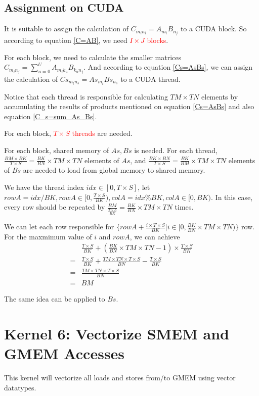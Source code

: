 \documentclass{article}
\begin{document}
\subsection{Assignment on CUDA}
It is suitable to assign the calculation of
$
    C_{m_in_i}=A_{m_i}B_{n_j}
$
to a CUDA block.
So according to equation \eqref{C=AB},
we need \textcolor{red}{$I \times J$ blocks}.

For each block, we need to calculate the smaller matrices
$
    C_{m_in_j}=\sum_{u=0}^{U} A_{m_ik_u}B_{k_un_j}
$.
And according to equation \eqref{Cs=AsBs},
we can assign the calculation of
$
    Cs_{m_tn_s}=As_{m_t}Bs_{n_s}
$
to a CUDA thread.

Notice that each thread is responsible for calculating
$
    TM\times TN
$
elements by accumulating the results of products mentioned on equation \eqref{Cs=AsBs}
and also equation \eqref{C_s=sum_As_Bs}.

For each block,
\textcolor{red}{
    $
        T\times S
    $
    threads} are needed.

For each block, shared memory of $As,Bs$ is needed.
For each thread,
$
    \frac{BM\times BK}{T\times S}=\frac{BK}{BN}\times TM\times TN
$
elements of
$
    As
$,
and
$
    \frac{BK\times BN}{T\times S}=\frac{BK}{BM}\times TM\times TN
$
elements of
$
    Bs
$
are needed to load from global memory to shared memory.

We have the thread index $idx\in [0, T\times S]$,
let
$
    rowA=idx / BK, rowA \in [0, \frac{T\times S}{BK}),
    colA=idx \% BK, colA \in [0, BK)
$.
In this case, every row should be repeated by
$
    \frac{BM}{\frac{T\times S}{BK}}=\frac{BK}{BN}\times TM\times TN
$
times.

We can let each row responsible for
$
    \{
    rowA+ \frac{i\times T\times S}{BK} | i \in[0, \frac{BK}{BN}\times TM\times TN)
    \}
$
row.
For the maxmimum value of $i$ and $rowA$, we can achieve
\begin{align*}
      & \frac{T\times S}{BK}+(\frac{BK}{BN}\times TM\times TN -1)\times \frac{T\times S}{BK}
    \\
    = & \frac{T\times S}{BK}+\frac{TM\times TN \times T\times S}{BN}-\frac{T\times S}{BK}
    \\
    = & \frac{TM\times TN \times T\times S}{BN}
    \\
    = & BM
\end{align*}

The same idea can be applied to $Bs$.

\section{Kernel 6: Vectorize SMEM and GMEM Accesses}
This kernel will vectorize all loads and stores from/to GMEM using vector datatypes.
\end{document}
